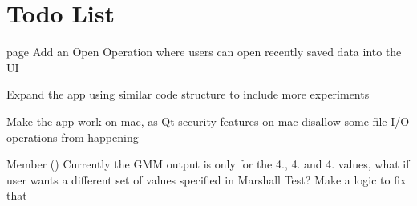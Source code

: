 \chapter{Todo List}
\hypertarget{todo}{}\label{todo}

\begin{DoxyRefList}
\item[page \doxylink{index}{Layer Build\+: Road Test Report Generator} ]\label{todo__todo000002}%
%
Add an \textquotesingle{}Open\textquotesingle{} Operation where users can open recently saved data into the UI 



Expand the app using similar code structure to include more experiments 



Make the app work on mac, as Qt security features on mac disallow some file I/O operations from happening  
\item[Member \doxylink{group___h_t_m_l_gen_funcs_gaf9b8272667a9b03cfd908e9a0cc1a7d4}{Main\+Window\+::generate\+\_\+html\+\_\+gmm} ()]\label{todo__todo000001}%
%
Currently the GMM output is only for the 4., 4. and 4. values, what if user wants a different set of values specified in Marshall Test? Make a logic to fix that 
\end{DoxyRefList}